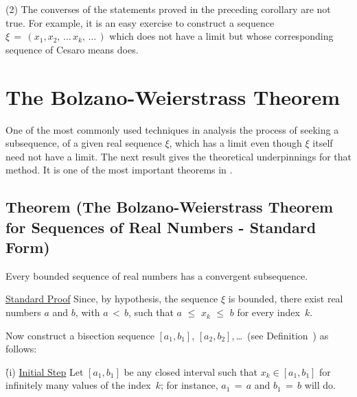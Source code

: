         (2) The converses of the statements proved in the preceding corollary are not true. 
    For example, it is an easy exercise to construct a sequence
    ${\xi} \,=\, (x_{1}, x_{2},\,{\ldots}\,x_{k},\,{\ldots}\,)$ which does not have a limit but whose corresponding sequence of Cesaro means does.

\VV


                \section{{\bf The Bolzano-Weierstrass Theorem}}
                \label{SectC30}


        One of the most commonly used techniques in analysis the process of seeking a subsequence, of a given real sequence ${\xi}$,
    which has a limit even though ${\xi}$ itself need not have a limit. The next result gives the theoretical underpinnings for that method.
    It is one of the most important theorems in {\ThisText}.

\V

            \subsection{\small{\bf Theorem} (The Bolzano-Weierstrass Theorem for Sequences of Real Numbers - Standard Form)}
            \label{ThmC30.10}

\V

        Every bounded sequence of real numbers has a convergent subsequence.

\V

        \underline{Standard Proof} Since, by hypothesis, the sequence ${\xi}$ is bounded,
    there exist real numbers $a$ and $b$, with $a\,<\,b$, such that $a\,\,{\leq}\,\,x_{k}\,\,{\leq}\,\,b$ for every index~$k$.


    Now construct a bisection sequence $[a_{1},b_{1}]$, $[a_{2},b_{2}]$,\,{\ldots}\, (see Definition~) as follows:

        \h (i) \underline{Initial Step} Let $[a_{1}, b_{1}]$ be any closed interval such that $x_{k}{\in}[a_{1}, b_{1}]$ for infinitely many values of the index~$k$;
    for instance, $a_{1} \,=\, a$ and $b_{1} \,=\, b$ will do.


